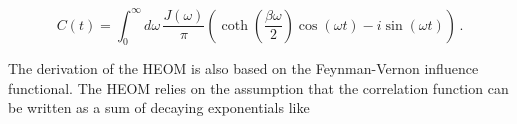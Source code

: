 \documentclass[preprint,3p,sort&compress]{elsarticle}
\begin{document}
\begin{equation}
    C(t)= \int_{0}^{\infty} d\omega\, \frac{J(\omega)}{\pi} \left( \coth\left({\frac{\beta \omega}{2}}\right) \cos\left({\omega t}\right) - i \sin\left({\omega t}\right)\right)\, .
\end{equation}






The derivation of the HEOM is also based on the Feynman-Vernon influence functional. The HEOM relies on the assumption that the correlation function can be written as a sum of decaying exponentials like

\end{document}
